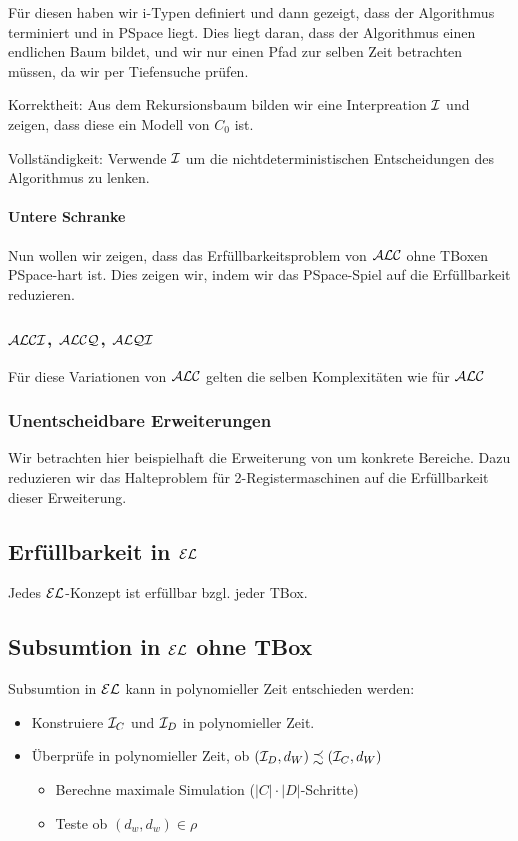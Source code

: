 Für diesen haben wir i-Typen definiert und dann gezeigt, dass der Algorithmus terminiert und in PSpace liegt. Dies liegt daran, dass der Algorithmus einen endlichen Baum bildet, und wir nur einen Pfad zur selben Zeit betrachten müssen, da wir per Tiefensuche prüfen.

Korrektheit: Aus dem Rekursionsbaum bilden wir eine Interpreation $\mathcal{I}$ und zeigen, dass diese ein Modell von $C_0$ ist.

Vollständigkeit: Verwende $\mathcal{I}$ um die nichtdeterministischen Entscheidungen des Algorithmus zu lenken.

\paragraph{Untere Schranke}

Nun wollen wir zeigen, dass das Erfüllbarkeitsproblem von  $\mathcal{A}\mathcal{L}\mathcal{C}$ ohne TBoxen PSpace-hart ist. Dies zeigen wir, indem wir das PSpace-Spiel auf die Erfüllbarkeit reduzieren. 

\subsubsection{$\mathcal{A}\mathcal{L}\mathcal{C}\mathcal{I}$, $\mathcal{A}\mathcal{L}\mathcal{C}\mathcal{Q}$, $\mathcal{A}\mathcal{L}\mathcal{Q}\mathcal{I}$}

Für diese Variationen von $\mathcal{A}\mathcal{L}\mathcal{C}$ gelten die selben Komplexitäten wie für $\mathcal{A}\mathcal{L}\mathcal{C}$

\subsubsection{Unentscheidbare Erweiterungen}

Wir betrachten hier beispielhaft die Erweiterung von um konkrete Bereiche. Dazu reduzieren wir das Halteproblem für 2-Registermaschinen auf die Erfüllbarkeit dieser Erweiterung.

\subsection{Erfüllbarkeit in $\mathcal{E}\mathcal{L}$}

Jedes $\mathcal{E}\mathcal{L}$-Konzept ist erfüllbar bzgl. jeder TBox.

\subsection{Subsumtion in $\mathcal{E}\mathcal{L}$ ohne TBox}

Subsumtion in $\mathcal{E}\mathcal{L}$ kann in polynomieller Zeit entschieden werden:

\begin{itemize}
	\item Konstruiere $\mathcal{I}_C$ und $\mathcal{I}_D$ in polynomieller Zeit.
	\item Überprüfe in polynomieller Zeit, ob $(\mathcal{I}_D,d_W) \precsim (\mathcal{I}_C,d_W)$
	\begin{itemize}
		\item Berechne maximale Simulation ($|C| \cdot |D|$-Schritte)
		\item Teste ob $(d_w,d_w) \in \rho$
	\end{itemize}
\end{itemize}

